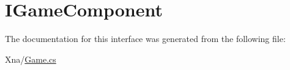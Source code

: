 \hypertarget{interfaceMicrosoft_1_1Xna_1_1Framework_1_1IGameComponent}{}\section{I\+Game\+Component}
\label{interfaceMicrosoft_1_1Xna_1_1Framework_1_1IGameComponent}


The documentation for this interface was generated from the following file\+:\begin{DoxyCompactItemize}
\item 
Xna/\hyperlink{Game_8cs}{Game.\+cs}\end{DoxyCompactItemize}

